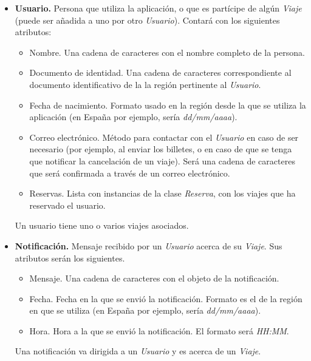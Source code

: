 \begin{itemize}
    \item \textbf{Usuario.} Persona que utiliza la aplicación, o que es partícipe de algún \textit{Viaje} (puede ser
        añadida a uno por otro \textit{Usuario}). Contará con los siguientes atributos:
        \begin{itemize}
            \item Nombre. Una cadena de caracteres con el nombre completo de la persona.
            \item Documento de identidad. Una cadena de caracteres correspondiente al documento identificativo de la
                la región pertinente al \textit{Usuario}.
            \item Fecha de nacimiento. Formato usado en la región desde la que se utiliza la aplicación (en España por ejemplo,
                sería \textit{dd/mm/aaaa}).
            \item Correo electrónico. Método para contactar con el \textit{Usuario} en caso de ser necesario (por ejemplo, al
                enviar los billetes, o en caso de que se tenga que notificar la cancelación de un viaje). Será una cadena de
                caracteres que será confirmada a través de un correo electrónico.
            \item Reservas. Lista con instancias de la clase \textit{Reserva}, con los viajes que ha reservado el usuario.
        \end{itemize}
        Un usuario tiene uno o varios viajes asociados.
    
    \item \textbf{Notificación.} Mensaje recibido por un \textit{Usuario} acerca de su \textit{Viaje}. Sus atributos serán los siguientes.
        \begin{itemize}
            \item Mensaje. Una cadena de caracteres con el objeto de la notificación.
            \item Fecha. Fecha en la que se envió la notificación. Formato es el de la región en que se utiliza (en España por ejemplo,
                sería \textit{dd/mm/aaaa}).
            \item Hora. Hora a la que se envió la notificación. El formato será \textit{HH:MM}.
        \end{itemize}

        Una notificación va dirigida a un \textit{Usuario} y es acerca de un \textit{Viaje}.
    

\end{itemize}
